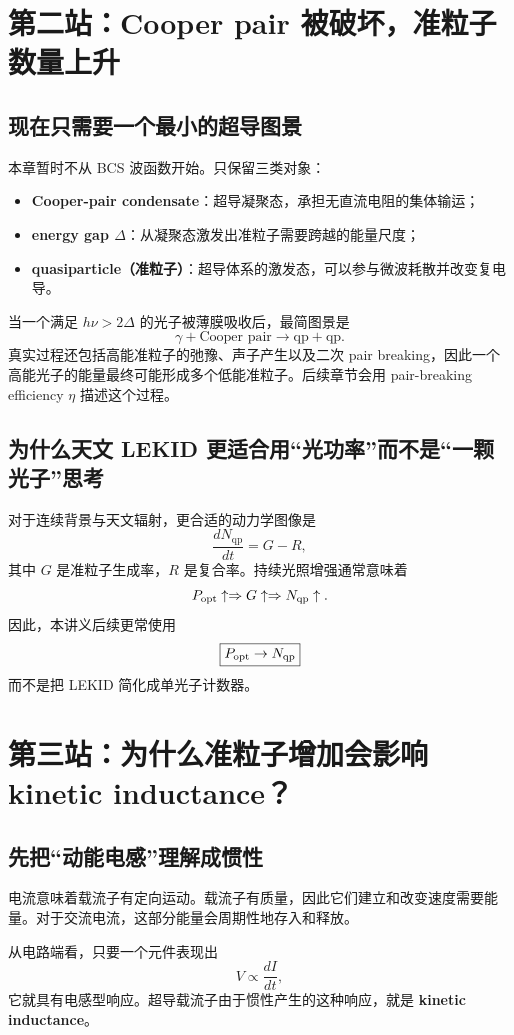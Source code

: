 \documentclass[11pt,a4paper,openany]{ctexrep}
\newcommand{\qp}{\mathrm{qp}}
\begin{document}
\section{第二站：Cooper pair 被破坏，准粒子数量上升}

\subsection{现在只需要一个最小的超导图景}
本章暂时不从 BCS 波函数开始。只保留三类对象：
\begin{itemize}
  \item \textbf{Cooper-pair condensate}：超导凝聚态，承担无直流电阻的集体输运；
  \item \textbf{energy gap $\Delta$}：从凝聚态激发出准粒子需要跨越的能量尺度；
  \item \textbf{quasiparticle（准粒子）}：超导体系的激发态，可以参与微波耗散并改变复电导。
\end{itemize}

当一个满足 $h\nu>2\Delta$ 的光子被薄膜吸收后，最简图景是
\[
\gamma + \text{Cooper pair}\rightarrow \qp+\qp.
\]
真实过程还包括高能准粒子的弛豫、声子产生以及二次 pair breaking，因此一个高能光子的能量最终可能形成多个低能准粒子。后续章节会用 pair-breaking efficiency $\eta$ 描述这个过程。

\subsection{为什么天文 LEKID 更适合用“光功率”而不是“一颗光子”思考}
对于连续背景与天文辐射，更合适的动力学图像是
\[
\frac{dN_{\qp}}{dt}=G-R,
\]
其中 $G$ 是准粒子生成率，$R$ 是复合率。持续光照增强通常意味着
\[
P_{\rm opt}\uparrow \Rightarrow G\uparrow \Rightarrow N_{\qp}\uparrow.
\]
因此，本讲义后续更常使用
\[
\boxed{P_{\rm opt}\rightarrow N_{\qp}}
\]
而不是把 LEKID 简化成单光子计数器。

\section{第三站：为什么准粒子增加会影响 kinetic inductance？}

\subsection{先把“动能电感”理解成惯性}
电流意味着载流子有定向运动。载流子有质量，因此它们建立和改变速度需要能量。对于交流电流，这部分能量会周期性地存入和释放。

从电路端看，只要一个元件表现出
\[
V\propto\frac{dI}{dt},
\]
它就具有电感型响应。超导载流子由于惯性产生的这种响应，就是 \textbf{kinetic inductance}。
\end{document}
